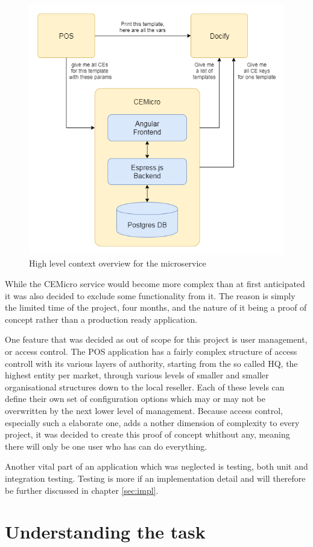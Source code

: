 \begin{figure}
  \centering
  \includegraphics[width=0.6\linewidth]{assets/high-level-overview.png}
  \caption{High level context overview for the microservice}
  \label{fig:context}
\end{figure}

While the CEMicro service would become more complex than at first anticipated it was also decided to exclude some functionality from it. The reason is simply the limited time of the project, four months, and the nature of it being a proof of concept rather than a production ready application.

One feature that was decided as out of scope for this project is user management, or access control. The POS application has a fairly complex structure of access controll with its various layers of authority, starting from the so called HQ, the highest entity per market, through various levels of smaller and smaller organisational structures down to the local reseller. Each of these levels can define their own set of configuration options which may or may not be overwritten by the next lower level of management. Because access control, especially such a elaborate one, adds a nother dimension of complexity to every project, it was decided to create this proof of concept whithout any, meaning there will only be one user who has can do everything.

Another vital part of an application which was neglected is testing, both unit and integration testing. Testing is more if an implementation detail and will therefore be further discussed in chapter \ref{sec:impl}.

\section{Understanding the task}

